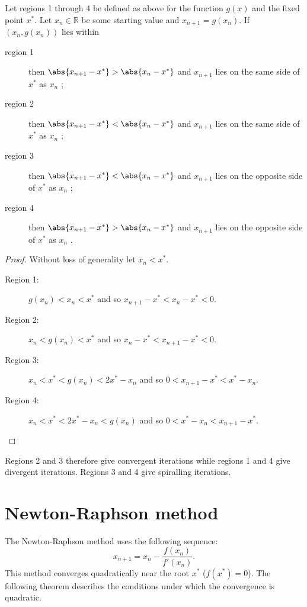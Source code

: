 \documentclass{article}
\begin{document}
\begin{lemma}
Let regions 1 through 4 be defined as above for the function $g(x)$ and the fixed point $x^*$.
Let $x_n \in \mathbb{R}$ be some starting value and $x_{n+1} = g(x_n)$.
If $(x_n, g(x_n))$ lies within
\begin{description}
\item[region 1] then $\abs{x_{n+1} - x^*} > \abs{x_n - x^*}$ and $x_{n+1}$ lies on the same side of $x^*$ as $x_n$ ;
\item[region 2] then $\abs{x_{n+1} - x^*} < \abs{x_n - x^*}$ and $x_{n+1}$ lies on the same side of $x^*$ as $x_n$ ;
\item[region 3] then $\abs{x_{n+1} - x^*} < \abs{x_n - x^*}$ and $x_{n+1}$ lies on the opposite side of $x^*$ as $x_n$ ;
\item[region 4] then $\abs{x_{n+1} - x^*} > \abs{x_n - x^*}$ and $x_{n+1}$ lies on the opposite side of $x^*$ as $x_n$ .
\end{description}
\end{lemma}

\begin{proof}
Without loss of generality let $x_n < x^*$.
\begin{description}
\item[Region 1:] $g(x_n) < x_n < x^*$ and so $x_{n+1} - x^* < x_n - x^* < 0$.
\item[Region 2:] $x_n < g(x_n) < x^*$ and so $x_n - x^* < x_{n+1} - x^* < 0$.
\item[Region 3:] $x_n < x^* < g(x_n) < 2 x^* - x_n$ and so $0 < x_{n+1} - x^* < x^* - x_n$.
\item[Region 4:] $x_n < x^* < 2 x^* - x_n < g(x_n)$ and so $0 < x^* - x_n < x_{n+1} - x^*$.
\end{description}
\end{proof}

Regions 2 and 3 therefore give convergent iterations while regions 1 and 4 give divergent iterations.
Regions 3 and 4 give spiralling iterations.

\section{Newton-Raphson method}
\label{sec:nrm}

The Newton-Raphson method uses the following sequence:
\begin{equation*}
x_{n+1} = x_n - \frac{f(x_n)}{f'(x_n)} .
\end{equation*}
This method converges quadratically near the root $x^*$ ($f(x^*) = 0$).
The following theorem describes the conditions under which the convergence is quadratic.
\end{document}
